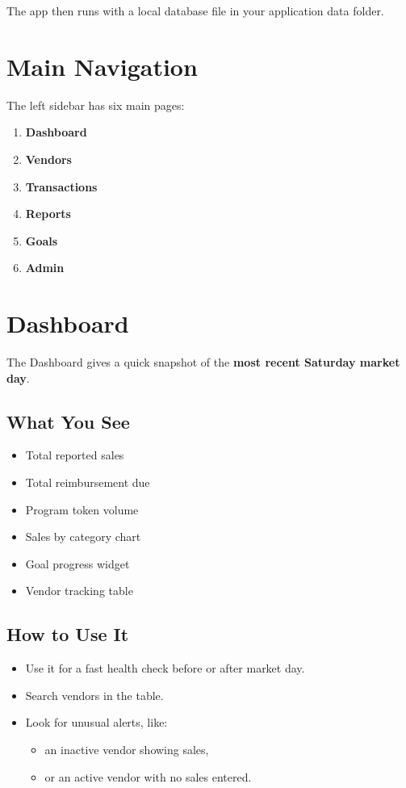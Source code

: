 \documentclass[11pt]{article}
\begin{document}
The app then runs with a local database file in your application data folder.

\section{Main Navigation}
\label{sec:main-navigation}
The left sidebar has six main pages:
\begin{enumerate}
  \item \textbf{Dashboard}
  \item \textbf{Vendors}
  \item \textbf{Transactions}
  \item \textbf{Reports}
  \item \textbf{Goals}
  \item \textbf{Admin}
\end{enumerate}

\section{Dashboard}
The Dashboard gives a quick snapshot of the \textbf{most recent Saturday market day}.

\subsection{What You See}
\begin{itemize}
  \item Total reported sales
  \item Total reimbursement due
  \item Program token volume
  \item Sales by category chart
  \item Goal progress widget
  \item Vendor tracking table
\end{itemize}

\subsection{How to Use It}
\begin{itemize}
  \item Use it for a fast health check before or after market day.
  \item Search vendors in the table.
  \item Look for unusual alerts, like:
  \begin{itemize}
    \item an inactive vendor showing sales,
    \item or an active vendor with no sales entered.
  \end{itemize}
\end{itemize}
\end{document}
